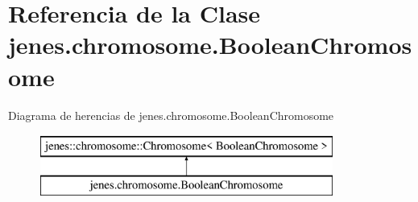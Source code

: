 \hypertarget{classjenes_1_1chromosome_1_1_boolean_chromosome}{\section{Referencia de la Clase jenes.\-chromosome.\-Boolean\-Chromosome}
\label{classjenes_1_1chromosome_1_1_boolean_chromosome}
}
Diagrama de herencias de jenes.\-chromosome.\-Boolean\-Chromosome\begin{figure}[H]
\begin{center}
\leavevmode
\includegraphics[height=2.000000cm]{classjenes_1_1chromosome_1_1_boolean_chromosome}
\end{center}
\end{figure}
